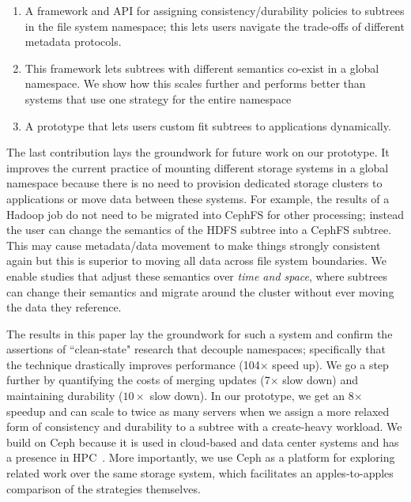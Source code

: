 \begin{enumerate}

  \item A framework and API for assigning consistency/durability policies 
  to subtrees in the file system namespace; this lets users navigate
  the trade-offs of different metadata protocols.

  \item This framework lets subtrees with different semantics co-exist in a
  global namespace. We show how this scales further and performs better than
  systems that use one strategy for the entire namespace 

  \item A prototype that lets users custom fit subtrees to applications
  dynamically. 

\end{enumerate}

The last contribution lays the groundwork for future work on our prototype. It
improves the current practice of mounting different storage systems in a global
namespace because there is no need to provision dedicated storage clusters to
applications or move data between these systems.  For example, the results of a
Hadoop job do not need to be migrated into CephFS for other processing; instead
the user can change the semantics of the HDFS subtree into a CephFS subtree.
This may cause metadata/data movement to make things strongly consistent again
but this is superior to moving all data across file system boundaries. We
enable studies that adjust these semantics over {\it time and space}, where
subtrees can change their semantics and migrate around the cluster without ever
moving the data they reference.

The results in this paper lay the groundwork for such a system and confirm the
assertions of ``clean-state" research that decouple namespaces; specifically
that the technique drastically improves performance (104\(\times\) speed up).
We go a step further by quantifying the costs of merging updates (7\(\times\)
slow down) and maintaining durability (\(10\times\) slow down). In our
prototype, we get an 8\(\times\) speedup and can scale to twice as many servers
when we assign a more relaxed form of consistency and durability to a subtree
with a create-heavy workload.  We build on Ceph because it is used in
cloud-based and data center systems and has a presence in HPC~\cite{}.  More
importantly,  we use Ceph as a platform for exploring related work over the
same storage system, which facilitates an apples-to-apples comparison of the
strategies themselves.  


